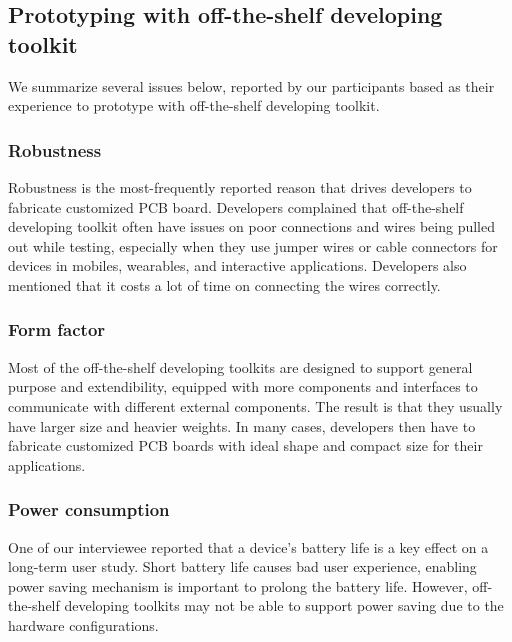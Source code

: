 


\subsection{Prototyping with off-the-shelf developing toolkit}
We summarize several issues below, reported by our participants based as their experience to prototype with off-the-shelf developing toolkit.

\subsubsection{Robustness}
Robustness is the most-frequently reported reason that drives developers to fabricate customized PCB board.
Developers complained that off-the-shelf developing toolkit often have issues on poor connections and wires being pulled out while testing, especially when they use jumper wires or cable connectors for devices in mobiles, wearables, and interactive applications.
Developers also mentioned that it costs a lot of time on connecting the wires correctly.

\subsubsection{Form factor}
Most of the off-the-shelf developing toolkits are designed to support general purpose and extendibility, equipped with more components and interfaces to communicate with different external components.
The result is that they usually have larger size and heavier weights.
In many cases, developers then have to fabricate customized PCB boards with ideal shape and compact size for their applications.

\subsubsection{Power consumption}
One of our interviewee reported that a device's battery life is a key effect on a long-term user study. 
Short battery life causes bad user experience, enabling power saving mechanism is important to prolong the battery life.
However, off-the-shelf developing toolkits may not be able to support power saving due to the hardware configurations.



